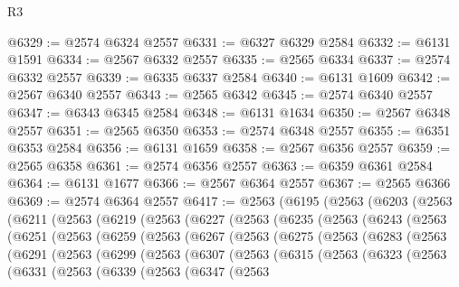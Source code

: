 \begin{lexlean}{R3}
\begin{coremodule}
@6329 := @2574 @6324 @2557
@6331 := @6327 @6329 @2584
@6332 := @6131 @1591
@6334 := @2567 @6332 @2557
@6335 := @2565 @6334
@6337 := @2574 @6332 @2557
@6339 := @6335 @6337 @2584
@6340 := @6131 @1609
@6342 := @2567 @6340 @2557
@6343 := @2565 @6342
@6345 := @2574 @6340 @2557
@6347 := @6343 @6345 @2584
@6348 := @6131 @1634
@6350 := @2567 @6348 @2557
@6351 := @2565 @6350
@6353 := @2574 @6348 @2557
@6355 := @6351 @6353 @2584
@6356 := @6131 @1659
@6358 := @2567 @6356 @2557
@6359 := @2565 @6358
@6361 := @2574 @6356 @2557
@6363 := @6359 @6361 @2584
@6364 := @6131 @1677
@6366 := @2567 @6364 @2557
@6367 := @2565 @6366
@6369 := @2574 @6364 @2557
@6417 := @2563
    (@6195
      (@2563
        (@6203
          (@2563
            (@6211
              (@2563
                (@6219
                  (@2563
                    (@6227
                      (@2563
                        (@6235
                          (@2563
                            (@6243
                              (@2563
                                (@6251
                                  (@2563
                                    (@6259
                                      (@2563
                                        (@6267
                                          (@2563
                                            (@6275
                                              (@2563
                                                (@6283
                                                  (@2563
                                                    (@6291
                                                      (@2563
                                                        (@6299
                                                          (@2563
                                                            (@6307
                                                              (@2563
                                                                (@6315
                                                                  (@2563
                                                                    (@6323
                                                                      (@2563
                                                                        (@6331
                                                                          (@2563
                                                                            (@6339
                                                                              (@2563
                                                                                (@6347
                                                                                  (@2563

\end{coremodule}
\end{lexlean}
